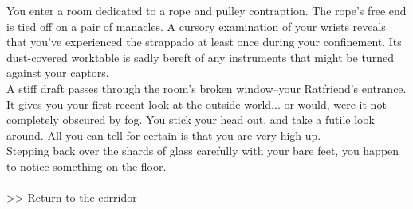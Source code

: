 You enter a room dedicated to a rope and pulley contraption. The rope’s free end is tied off on a pair of manacles. A cursory examination of your wrists reveals that you’ve experienced the strappado at least once during your confinement. Its dust-covered worktable is sadly bereft of any instruments that might be turned against your captors.\\

A stiff draft passes through the room’s broken window--your Ratfriend’s entrance. It gives you your first recent look at the outside world... or would, were it not completely obscured by fog. You stick your head out, and take a futile look around. All you can tell for certain is that you are very high up.\\

Stepping back over the shards of glass carefully with your bare feet, you happen to notice something on the floor.\\
\\

>> Return to the corridor -- 